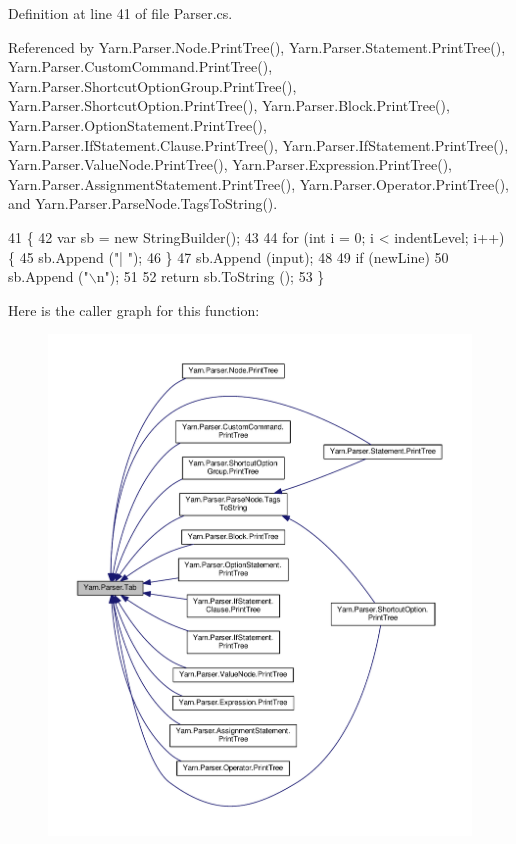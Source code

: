 Definition at line 41 of file Parser.\-cs.



Referenced by Yarn.\-Parser.\-Node.\-Print\-Tree(), Yarn.\-Parser.\-Statement.\-Print\-Tree(), Yarn.\-Parser.\-Custom\-Command.\-Print\-Tree(), Yarn.\-Parser.\-Shortcut\-Option\-Group.\-Print\-Tree(), Yarn.\-Parser.\-Shortcut\-Option.\-Print\-Tree(), Yarn.\-Parser.\-Block.\-Print\-Tree(), Yarn.\-Parser.\-Option\-Statement.\-Print\-Tree(), Yarn.\-Parser.\-If\-Statement.\-Clause.\-Print\-Tree(), Yarn.\-Parser.\-If\-Statement.\-Print\-Tree(), Yarn.\-Parser.\-Value\-Node.\-Print\-Tree(), Yarn.\-Parser.\-Expression.\-Print\-Tree(), Yarn.\-Parser.\-Assignment\-Statement.\-Print\-Tree(), Yarn.\-Parser.\-Operator.\-Print\-Tree(), and Yarn.\-Parser.\-Parse\-Node.\-Tags\-To\-String().


\begin{DoxyCode}
41                                                                                       \{
42             var sb = \textcolor{keyword}{new} StringBuilder();
43 
44             \textcolor{keywordflow}{for} (\textcolor{keywordtype}{int} i = 0; i < indentLevel; i++) \{
45                 sb.Append (\textcolor{stringliteral}{"| "});
46             \}
47             sb.Append (input);
48 
49             \textcolor{keywordflow}{if} (newLine)
50                 sb.Append (\textcolor{stringliteral}{"\(\backslash\)n"});
51 
52             \textcolor{keywordflow}{return} sb.ToString ();
53         \}
\end{DoxyCode}


Here is the caller graph for this function\-:
\nopagebreak
\begin{figure}[H]
\begin{center}
\leavevmode
\includegraphics[width=350pt]{a00151_aa8fa36b46de12a1c561d77b99c4b9ae3_icgraph}
\end{center}
\end{figure}




